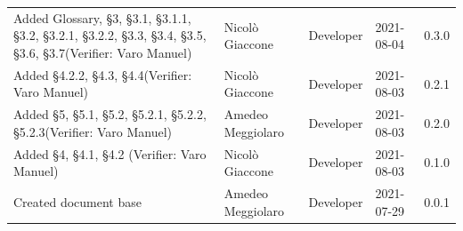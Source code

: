 \documentclass[a4paper]{article}
\begin{document}
\begin{center}
\begin{table}[h!]
\begin{tabular}{p{150px} p{90px} p{80px} p{60px} p{45px}}
            Added Glossary, \S{3}, \S{3.1}, \S{3.1.1}, \S{3.2}, \S{3.2.1}, \S{3.2.2}, \S{3.3}, \S{3.4}, \S{3.5}, \S{3.6}, \S{3.7}\newline(Verifier: Varo Manuel) & Nicolò Giaccone   & Developer     & 2021-08-04    & 0.3.0            \\
            Added \S{4.2.2}, \S{4.3}, \S{4.4}\newline(Verifier: Varo Manuel)                                                                                     & Nicolò Giaccone   & Developer     & 2021-08-03    & 0.2.1            \\
            Added \S{5}, \S{5.1}, \S{5.2}, \S{5.2.1}, \S{5.2.2}, \S{5.2.3}\newline(Verifier: Varo Manuel)                                                        & Amedeo Meggiolaro & Developer     & 2021-08-03    & 0.2.0            \\
            Added \S{4}, \S{4.1}, \S{4.2}  \newline(Verifier: Varo Manuel)                                                                                       & Nicolò Giaccone   & Developer     & 2021-08-03    & 0.1.0            \\
            Created document base                                                                                                                                & Amedeo Meggiolaro & Developer     & 2021-07-29    & 0.0.1            \\
        \end{tabular}
    \end{table}
\end{center}

\newpage
\tableofcontents
\newpage
\newpage
\listoffigures
\newpage







\end{document}
